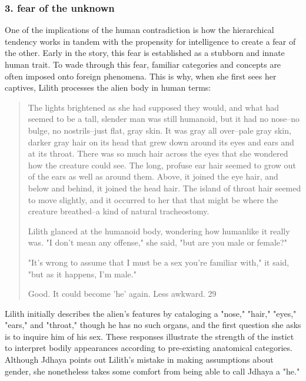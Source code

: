 \documentclass[11pt]{article}
\begin{document}
\subsubsection{3. fear of the unknown}
\label{sec:orge27d612}
One of the implications of the human contradiction is how the
hierarchical tendency works in tandem with the propensity for
intelligence to create a fear of the other. Early in the story, this
fear is established as a stubborn and innate human trait. To wade
through this fear, familiar categories and concepts are often imposed
onto foreign phenomena. This is why, when she first sees her captives,
Lilith processes the alien body in human terms:
\begin{quote}
The lights brightened as she had supposed they would, and what had
seemed to be a tall, slender man was still humanoid, but it had no
nose--no bulge, no nostrils--just flat, gray skin. It was gray all
over--pale gray skin, darker gray hair on its head that grew down
around its eyes and ears and at its throat. There was so much hair
across the eyes that she wondered how the creature could see. The
long, profuse ear hair seemed to grow out of the ears as well as
around them. Above, it joined the eye hair, and below and behind, it
joined the head hair. The island of throat hair seemed to move
slightly, and it occurred to her that that might be where the creature
breathed--a kind of natural tracheostomy.

Lilith glanced at the humanoid body, wondering how humanlike it really
was. "I don't mean any offense," she said, "but are you male or
female?"

"It's wrong to assume that I must be a sex you're familiar with," it
said, "but as it happens, I'm male."

Good. It could become 'he' again. Less awkward. 29
\end{quote}
Lilith initially describes the alien's features by cataloging a
"nose," "hair," "eyes," "ears," and "throat," though he has no such
organs, and the first question she asks is to inquire him of his
sex. These responses illustrate the strength of the instict to
interpret bodily appearances according to pre-existing anatomical
categories. Although Jdhaya points out Lilith's mistake in making
assumptions about gender, she nonetheless takes some comfort from
being able to call Jdhaya a "he."
\end{document}
